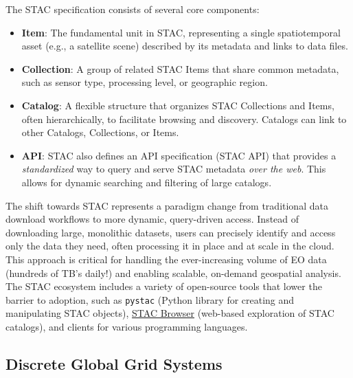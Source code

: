 \begin{multicols}{2}
The STAC specification consists of several core components:
\begin{itemize}
    \item \textbf{Item}: The fundamental unit in STAC, representing a single spatiotemporal asset (e.g., a satellite scene) described by its metadata and links to data files.
    \item \textbf{Collection}: A group of related STAC Items that share common metadata, such as sensor type, processing level, or geographic region.
    \item \textbf{Catalog}: A flexible structure that organizes STAC Collections and Items, often hierarchically, to facilitate browsing and discovery. Catalogs can link to other Catalogs, Collections, or Items.
    \item \textbf{API}: STAC also defines an API specification (STAC API) that provides a \textit{standardized} way to query and serve STAC metadata \textit{over the web}. This allows for dynamic searching and filtering of large catalogs.
\end{itemize}

The shift towards STAC represents a paradigm change from traditional data download workflows to more dynamic, query-driven access. 
Instead of downloading large, monolithic datasets, users can precisely identify and access only the data they need, often processing it in place and at scale in the cloud.
This approach is critical for handling the ever-increasing volume of EO data (hundreds of TB's daily!) and enabling scalable, on-demand geospatial analysis. 
The STAC ecosystem includes a variety of open-source tools that lower the barrier to adoption, such as \texttt{pystac} (Python library for creating and manipulating STAC objects), 
\href{https://radiantearth.github.io/stac-browser/#/external/maxar-opendata.s3.amazonaws.com/events/catalog.json?.language=en}{STAC Browser} (web-based exploration of STAC catalogs), 
and clients for various programming languages.


\subsection{Discrete Global Grid Systems}


\end{multicols}
